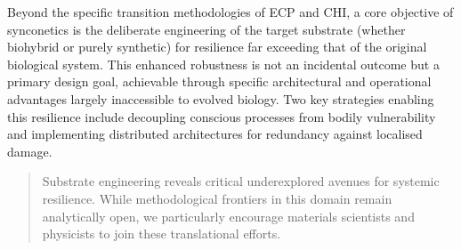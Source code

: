 \documentclass[10pt]{article}
\begin{document}
\begin{sloppypar}
  Beyond the specific transition methodologies of ECP and CHI, a core objective of synconetics is the deliberate engineering of the target substrate (whether biohybrid or purely synthetic) for resilience far exceeding that of the original biological system. This enhanced robustness is not an incidental outcome but a primary design goal, achievable through specific architectural and operational advantages largely inaccessible to evolved biology. Two key strategies enabling this resilience include decoupling conscious processes from bodily vulnerability and implementing distributed architectures for redundancy against localised damage.


  \begin{quote}
    Substrate engineering reveals critical underexplored avenues for systemic resilience. While methodological frontiers in this domain remain analytically open, we particularly encourage materials scientists and physicists to join these translational efforts.
  \end{quote}


\end{sloppypar}
\end{document}
